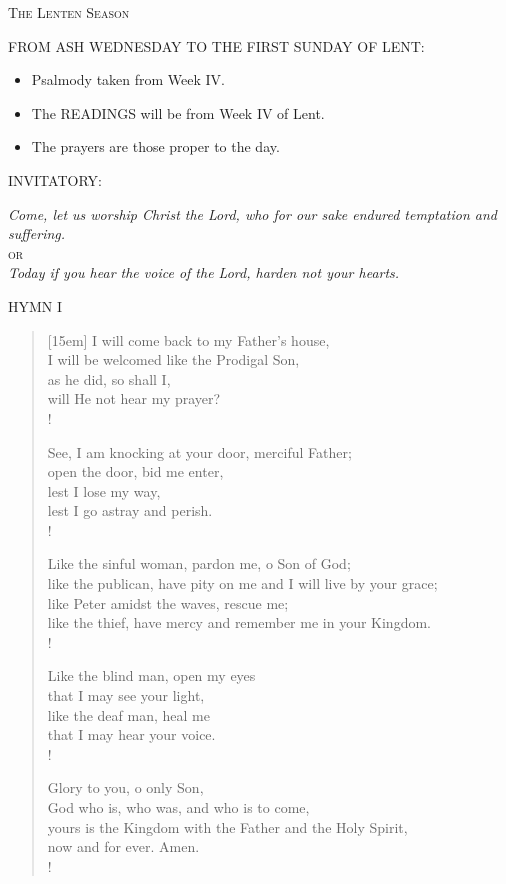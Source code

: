 \begin{center}\textsc{\small{The Lenten Season\\}}
\end{center}
\footnotesize{\uppercase{from Ash Wednesday to the First Sunday of Lent:}}

\begin{itemize}\tiny
\item Psalmody taken from Week IV.
\item The READINGS will be from Week IV of Lent.
\item The prayers are those proper to the day.
\end{itemize}

\noindent\small{INVITATORY:}
\begin{center}
\normalsize{\textit{Come, let us worship Christ the Lord, who for our sake endured temptation and suffering.\\}
\textsc{or}\\
\textit{Today if you hear the voice of the Lord, harden not your hearts.\\}}
\end{center}

\noindent\small{\uppercase{Hymn I}}\normalsize\label{lent:firstHymn}
\begin{verse}[15em]
I will come back to my Father's house,\\
I will be welcomed like the Prodigal Son,\\
as he did, so shall I,\\
will He not hear my prayer?\\!

See, I am knocking at your door, merciful Father;\\
open the door, bid me enter,\\
lest I lose my way,\\
lest I go astray and perish.\\!

Like the sinful woman, pardon me, o Son of God;\\
like the publican, have pity on me and I will live by your grace;\\
like Peter amidst the waves, rescue me;\\
like the thief, have mercy and remember me in your Kingdom.\\!

Like the blind man, open my eyes\\
that I may see your light,\\
like the deaf man,  heal me\\
that I may hear your voice.\\!

Glory to you, o only Son,\\
God who is, who was, and who is to come,\\
yours is the Kingdom with the Father and the Holy Spirit,\\
now and for ever. Amen.\\!
\end{verse}

